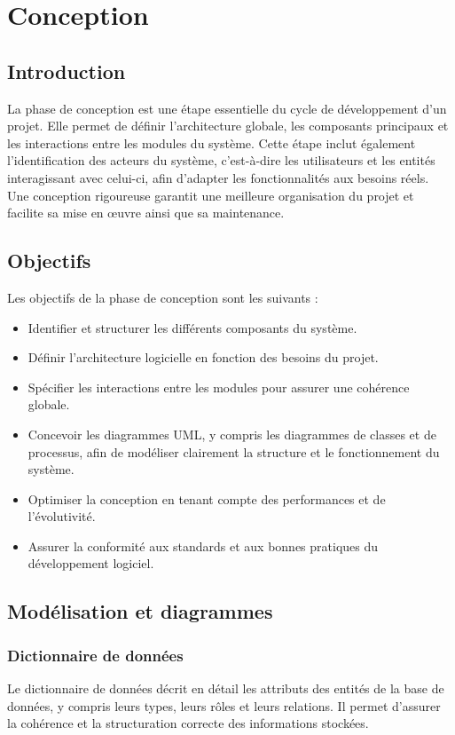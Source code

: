 \chapter{Conception}
\clearpage

\section{Introduction}
La phase de conception est une étape essentielle du cycle de développement d'un
projet. Elle permet de définir l'architecture globale, les composants
principaux et les interactions entre les modules du système. Cette étape inclut
également l'identification des acteurs du système, c'est-à-dire les
utilisateurs et les entités interagissant avec celui-ci, afin d'adapter les
fonctionnalités aux besoins réels. Une conception rigoureuse garantit une
meilleure organisation du projet et facilite sa mise en œuvre ainsi que sa
maintenance.

\section{Objectifs}
Les objectifs de la phase de conception sont les suivants :
\begin{itemize}
    \item Identifier et structurer les différents composants du système.
    \item Définir l'architecture logicielle en fonction des besoins du projet.
    \item Spécifier les interactions entre les modules pour assurer une cohérence
          globale.
    \item Concevoir les diagrammes UML, y compris les diagrammes de classes et de
          processus, afin de modéliser clairement la structure et le fonctionnement du
          système.
    \item Optimiser la conception en tenant compte des performances et de l'évolutivité.
    \item Assurer la conformité aux standards et aux bonnes pratiques du développement
          logiciel.
\end{itemize}

\section{Modélisation et diagrammes}

\subsection{Dictionnaire de données}
Le dictionnaire de données décrit en détail les attributs des entités de la
base de données, y compris leurs types, leurs rôles et leurs relations. Il
permet d'assurer la cohérence et la structuration correcte des informations
stockées.

